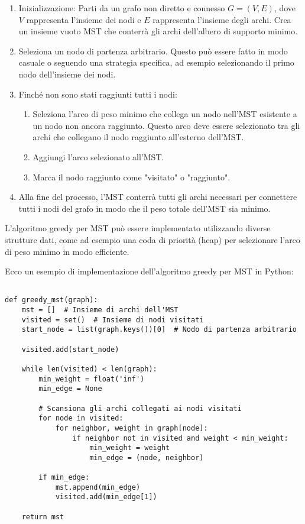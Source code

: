 \begin{enumerate}
  
  \item Inizializzazione: Parti da un grafo non diretto e connesso $G = (V, E)$, dove $V$ rappresenta l'insieme dei nodi e $E$ rappresenta l'insieme degli archi. Crea un insieme vuoto MST che conterrà gli archi dell'albero di supporto minimo.
  \item Seleziona un nodo di partenza arbitrario. Questo può essere fatto in modo casuale o seguendo una strategia specifica, ad esempio selezionando il primo nodo dell'insieme dei nodi.
  \item Finché non sono stati raggiunti tutti i nodi:
    \begin{enumerate}
      \item Seleziona l'arco di peso minimo che collega un nodo nell'MST esistente a un nodo non ancora raggiunto. Questo arco deve essere selezionato tra gli archi che collegano il nodo raggiunto all'esterno dell'MST.
      \item Aggiungi l'arco selezionato all'MST.
      \item Marca il nodo raggiunto come "visitato" o "raggiunto".
    \end{enumerate}
  \item Alla fine del processo, l'MST conterrà tutti gli archi necessari per connettere tutti i nodi del grafo in modo che il peso totale dell'MST sia minimo.
\end{enumerate}
L'algoritmo greedy per MST può essere implementato utilizzando diverse strutture dati, come ad esempio una coda di priorità (heap) per selezionare l'arco di peso minimo in modo efficiente.

Ecco un esempio di implementazione dell'algoritmo greedy per MST in Python:

\begin{lstlisting}
  
def greedy_mst(graph):
    mst = []  # Insieme di archi dell'MST
    visited = set()  # Insieme di nodi visitati
    start_node = list(graph.keys())[0]  # Nodo di partenza arbitrario
    
    visited.add(start_node)
    
    while len(visited) < len(graph):
        min_weight = float('inf')
        min_edge = None
        
        # Scansiona gli archi collegati ai nodi visitati
        for node in visited:
            for neighbor, weight in graph[node]:
                if neighbor not in visited and weight < min_weight:
                    min_weight = weight
                    min_edge = (node, neighbor)
        
        if min_edge:
            mst.append(min_edge)
            visited.add(min_edge[1])
    
    return mst
\end{lstlisting}

